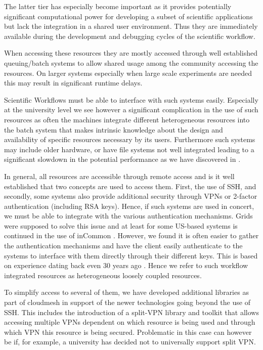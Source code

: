 \documentclass[utf8]{FrontiersinVancouver} %
\begin{document}
The latter tier has especially become important as it provides potentially significant computational power for developing a subset of scientific applications but lack the integration in a shared user environment. Thus they are immediately available during the development and debugging cycles of the scientific workflow.

When accessing these resources they are mostly accessed through well established queuing/batch systems to allow shared usage among the community accessing the resources. On larger systems especially when large scale experiments are needed this may result in significant runtime delays.

Scientific Workflows must be able to interface with such systems easily. Especially at the university level we see however a significant complication in the use of such resources as often the machines integrate different heterogeneous resources into the batch system that makes intrinsic knowledge about the design and availability of specific resources necessary by its users. Furthermore such systems may include older hardware, or have file systems not well integrated leading to a significant slowdown in the potential performance as we have discovered in \citep{las-frontiers-edu}. 

In general, all resources are accessible through remote access and is it well established that two concepts are used to access them. First, the use of SSH, and secondly, some systems also provide additional security through VPNs or 2-factor authentication (including RSA keys). Hence, if such systems are used in concert, we must be able to integrate with the various authentication mechanisms. Grids were supposed to solve this issue and at least for some US-based systems is continued in the use of inCommon \citep{incommon}. However, we found it is often easier to gather the authentication mechanisms and have the client easily authenticate to the systems to interface with them directly through their different keys. This is based on experience dating back even 30 years ago \cite{las-99-loosely}. Hence we refer to such workflow integrated resources as heterogeneous loosely coupled resources.

To simplify access to several of them, we have developed additional libraries as part of cloudmesh in
support of the newer technologies going beyond the use of SSH. This includes the introduction of a split-VPN library and toolkit that allows accessing multiple VPNs dependent on which resource is being used and through which VPN this resource is being secured. Problematic in this case can however be if, for example, a university has decided not to universally support split VPN.
\end{document}
